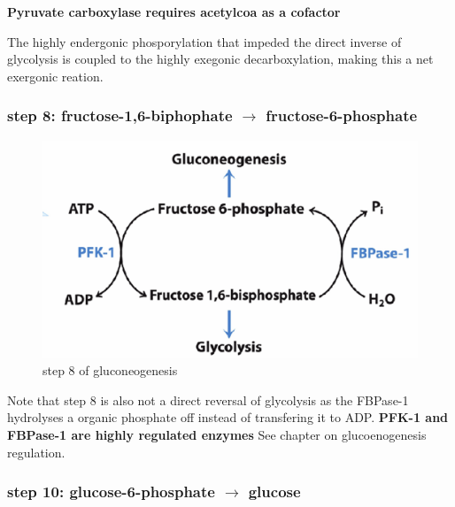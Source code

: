 \documentclass[../main.tex]{subfiles}
\begin{document}
\textbf{Pyruvate carboxylase requires \gls{acetylcoa} as a cofactor}

\begin{remark}
     The highly endergonic phosporylation that impeded the direct inverse of glycolysis is coupled to the highly exegonic decarboxylation, making this a net exergonic reation.
\end{remark}


\subsubsection{step 8: fructose-1,6-biphophate $\rightarrow$  fructose-6-phosphate}
\begin{figure}[H]
    \centering
    \includegraphics[width=0.5\linewidth]{step8.png}
    \caption{step 8 of gluconeogenesis}
    \label{fig:enter-label}
\end{figure}
Note that step 8 is also not a direct reversal of glycolysis as the FBPase-1 hydrolyses a organic phosphate off instead of transfering it to ADP. \textbf{PFK-1 and FBPase-1 are highly regulated enzymes} See chapter on glucoenogenesis regulation.
\subsubsection{step 10: glucose-6-phosphate $\rightarrow$ glucose}
\end{document}
